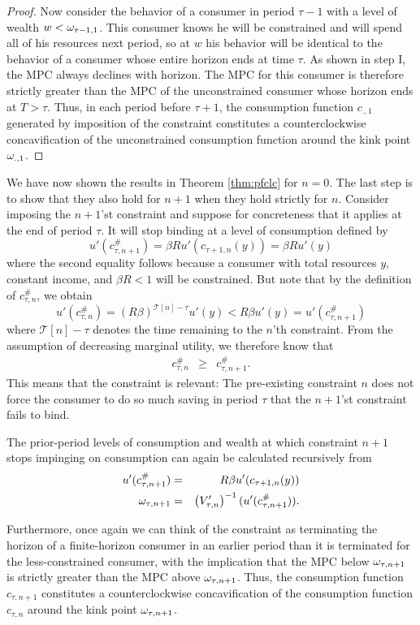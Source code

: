 \begin{proof}
Now consider the behavior of a consumer in period $\tau-1$ with a level of wealth $w<\omega_{\tau-1,1}$.  This consumer knows he will be constrained and will spend all of his resources next period, so at $w$ his behavior will be identical to the behavior of a consumer whose entire horizon ends at time $\tau$.  As shown in step I, the MPC always declines with horizon. The MPC for this consumer is therefore strictly greater than the MPC of the unconstrained consumer whose horizon ends at $T > \tau$.  Thus, in each period before $\tau+1$, the consumption function $c_{.,1}$ generated by imposition of the constraint constitutes a counterclockwise concavification of the unconstrained consumption function around the kink point $\omega_{.,1}$.
	\end{proof}
	
	We have now shown the results in Theorem \ref{thm:pfclc} for $n = 0$. The last step is to show that they also hold for $n+1$ when they hold strictly for $n$. Consider imposing the $n+1$'st constraint and suppose for concreteness that it applies at the end of period $\tau$. It will stop binding at a level of consumption defined by
$$u'(c_{\tau,n+1}^{\#}) = \beta R u'(c_{\tau+1,n}({y})) = \beta Ru'(y)$$
where the second equality follows because a consumer with total resources $y$, constant income, and $\beta R < 1$ will be constrained. But note that by the definition of $c^{\#}_{\tau,n}$, we obtain
	$$	u'(c_{\tau,n}^{\#})  =  (R \beta)^{\mathcal{T}[n]-\tau} u'({y})  <  R \beta u'({y}) = u'(c_{\tau,n+1}^{\#})$$
	where $\mathcal{T}[n]-\tau$ denotes the time remaining to the $n$'th constraint. From the assumption of decreasing marginal utility, we therefore know that
	\begin{eqnarray*}
		c_{\tau,n}^{\#} & \geq & c_{\tau,n+1}^{\#}.
	\end{eqnarray*}
	This means that the constraint is relevant: The pre-existing constraint $n$ does not force the consumer to do so much saving in period $\tau$ that the $n+1$'st constraint fails to bind.
	
	The prior-period levels of consumption and wealth at which constraint $n+1$ stops impinging on consumption can again be calculated recursively from
	\begin{eqnarray*}
		u'(c_{\tau,n+1}^{\#}) & = & R\beta u'(c_{\tau+1,n}({y}))
		\\  \omega_{\tau,n+1} & = & \left(V'_{\tau,n}\right)^{-1}(u'(c_{\tau,n+1}^{\#})).
	\end{eqnarray*}

	Furthermore, once again we can think of the constraint as terminating
	the horizon of a finite-horizon consumer in an earlier period than it
	is terminated for the less-constrained consumer, with the implication
	that the MPC below $\omega_{\tau,n+1}$ is strictly greater than the MPC
	above $\omega_{\tau,n+1}$.  Thus, the consumption function $c_{\tau,n+1}$
	constitutes a counterclockwise concavification of the consumption
	function $c_{\tau,n}$ around the kink point $\omega_{\tau,n+1}$.


